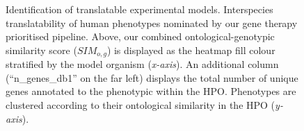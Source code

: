 \documentclass[
sn-nature
]{sn-jnl}
\begin{document}
\label{cell-fig-animal-models}
\begin{figure}[H]


\caption{\label{fig-animal-models}Identification of translatable
experimental models. Interspecies translatability of human phenotypes
nominated by our gene therapy prioritised pipeline. Above, our combined
ontological-genotypic similarity score (\(SIM_{o,g}\)) is displayed as
the heatmap fill colour stratified by the model organism
(\emph{x-axis}). An additional column (``n\_genes\_db1'' on the far
left) displays the total number of unique genes annotated to the
phenotypic within the HPO. Phenotypes are clustered according to their
ontological similarity in the HPO (\emph{y-axis}).}

\end{figure}%
\end{document}
